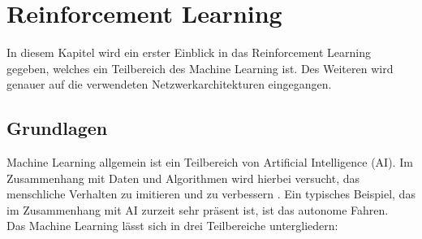 \chapter{Reinforcement Learning}  
\label{ch:RL}
In diesem Kapitel wird ein erster Einblick in das Reinforcement Learning gegeben, welches ein Teilbereich des Machine Learning ist. Des Weiteren wird genauer auf die verwendeten Netzwerkarchitekturen eingegangen. 

\section{Grundlagen}
\label{sect:RL_Grund}

Machine Learning allgemein ist ein Teilbereich von Artificial Intelligence (AI). Im Zusammenhang mit Daten und Algorithmen wird hierbei versucht, das menschliche Verhalten zu imitieren und zu verbessern \cite{IBM}. Ein typisches Beispiel, das im Zusammenhang mit AI zurzeit sehr präsent ist, ist das autonome Fahren.\\
Das Machine Learning lässt sich in drei Teilbereiche untergliedern:

